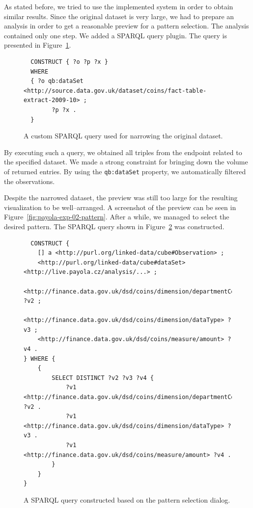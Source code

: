 As stated before, we tried to use the implemented system in order to obtain 
similar results. Since the original dataset is very large, we had to prepare an 
analysis in order to get a reasonable preview for a pattern selection. The 
analysis contained only one step. We added a SPARQL query plugin. The query is presented
in Figure~\ref{fig:coins-query-narrow}.

\begin{figure}
  \scriptsize
\begin{verbatim}
  CONSTRUCT { ?o ?p ?x }
  WHERE
  { ?o qb:dataSet <http://source.data.gov.uk/dataset/coins/fact-table-extract-2009-10> ;
        ?p ?x .
  }
\end{verbatim}
\caption{A custom SPARQL query used for narrowing the original dataset.}
\label{fig:coins-query-narrow}
\end{figure}

By executing such a query, we obtained all triples from the endpoint 
related to the specified dataset. We made a strong constraint for bringing 
down the volume of returned entries. By using the \texttt{qb:dataSet} property, 
we automatically filtered the observations.

Despite the narrowed dataset, the preview was still too large 
for the resulting visualization to be well--arranged. A screenshot of the 
preview can be seen in Figure~\ref{fig:payola-exp-02-pattern}. After a while,
we managed to select the desired 
pattern. The SPARQL query shown in Figure~\ref{fig:coins-pattern-result} was 
constructed.

\begin{figure}
  \scriptsize
\begin{verbatim}
  CONSTRUCT {
    [] a <http://purl.org/linked-data/cube#Observation> ;
    <http://purl.org/linked-data/cube#dataSet> <http://live.payola.cz/analysis/...> ;
    <http://finance.data.gov.uk/dsd/coins/dimension/departmentCode> ?v2 ;
    <http://finance.data.gov.uk/dsd/coins/dimension/dataType> ?v3 ;
    <http://finance.data.gov.uk/dsd/coins/measure/amount> ?v4 .
} WHERE {
    {
        SELECT DISTINCT ?v2 ?v3 ?v4 {
            ?v1 <http://finance.data.gov.uk/dsd/coins/dimension/departmentCode> ?v2 .
            ?v1 <http://finance.data.gov.uk/dsd/coins/dimension/dataType> ?v3 .
            ?v1 <http://finance.data.gov.uk/dsd/coins/measure/amount> ?v4 .
        }
    }
} 
\end{verbatim}
\caption{A SPARQL query constructed based on the pattern selection dialog.}
\label{fig:coins-pattern-result}
\end{figure}

